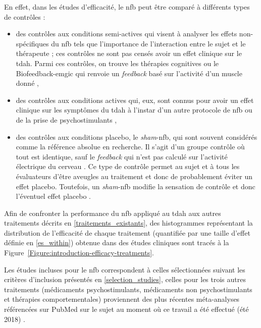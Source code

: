 En effet, dans les études d'efficacité, le \gls{nfb} peut être comparé à différents types de contrôles \citep{Arns2014} :
\begin{itemize}
\item des contrôles aux conditions semi-actives qui visent à analyser les effets non-spécifiques du \gls{nfb} tels que l'importance de l'interaction entre le sujet et le thérapeute ; 
ces contrôles ne sont pas censés avoir un effet clinique sur le \gls{tdah}. Parmi ces contrôles, on trouve les thérapies cognitives ou le Biofeedback-\gls{emgic} qui renvoie un \textit{feedback} basé
sur l'activité d'un muscle donné \citep{Bakhshayesh2011},
\item des contrôles aux conditions actives qui, eux, sont connus pour avoir un effet clinique sur les symptômes du \gls{tdah} à l'instar d'un autre protocole de \gls{nfb} \citep{Leins2007} ou
de la prise de psychostimulants \citep{Meisel2014},
\item des contrôles aux conditions placebo, le \textit{sham}-\gls{nfb}, qui sont souvent considérés comme la référence absolue en recherche. Il s'agit d'un groupe contrôle
où tout est identique, sauf le \textit{feedback} qui n'est pas calculé sur l'activité électrique du cerveau \citep{Arnold2014}. Ce type de contrôle permet 
au sujet et à tous les évaluateurs d'être aveugles au traitement et donc de probablement éviter un effet placebo. Toutefois, un \textit{sham}-\gls{nfb} modifie 
la sensation de contrôle et donc l'éventuel effet placebo \citep{Kober2018}. 
\end{itemize}

Afin de confronter la performance du \gls{nfb} appliqué au \gls{tdah} aux autres traitements décrits en \ref{traitements_existants}, des histogrammes
représentant la distribution de l'efficacité de chaque traitement (quantifiée par une taille d'effet définie en \ref{es_within}) obtenue dans des études cliniques
sont tracés à la Figure~\ref{Figure:introduction-efficacy-treatments}.

Les études incluses pour le \gls{nfb} correspondent à celles sélectionnées suivant les critères d'inclusion présentés en \ref{selection_studies}, celles pour les
trois autres traitements (médicaments psychostimulants, médicaments non psychostimulants et thérapies comportementales) proviennent des plus récentes méta-analyses 
référencées sur PubMed sur le sujet au moment où ce travail a été effectué (été 2018) \citep{Luan2017, Catala2017}.

